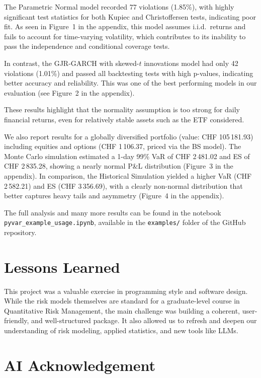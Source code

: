 \documentclass{article}
\begin{document}
The Parametric Normal model recorded 77 violations (1.85\%), with highly significant test statistics for both Kupiec and Christoffersen tests, indicating poor fit. As seen in Figure 1 in the appendix, this model assumes i.i.d.\ returns and fails to account for time-varying volatility, which contributes to its inability to pass the independence and conditional coverage tests.

In contrast, the GJR-GARCH with skewed-$t$ innovations model had only 42 violations (1.01\%) and passed all backtesting tests with high p-values, indicating better accuracy and reliability. This was one of the best performing models in our evaluation (see Figure 2 in the appendix).

These results highlight that the normality assumption is too strong for daily financial returns, even for relatively stable assets such as the ETF considered.

We also report results for a globally diversified portfolio (value: CHF 105\,181.93) including equities and options (CHF 1\,106.37, priced via the BS model). The Monte Carlo simulation estimated a 1-day 99\% VaR of CHF 2\,481.02 and ES of CHF 2\,835.28, showing a nearly normal P\&L distribution (Figure~3 in the appendix). In comparison, the Historical Simulation yielded a higher VaR (CHF 2\,582.21) and ES (CHF 3\,356.69), with a clearly non-normal distribution that better captures heavy tails and asymmetry (Figure~4 in the appendix).

The full analysis and many more results can be found in the notebook \texttt{pyvar\_example\_usage.ipynb}, available in the \texttt{examples/} folder of the GitHub repository.


\section{Lessons Learned}

This project was a valuable exercise in programming style and software design. While the risk models themselves are standard for a graduate-level course in Quantitative Risk Management, the main challenge was building a coherent, user-friendly, and well-structured package. It also allowed us to refresh and deepen our understanding of risk modeling, applied statistics, and new tools like LLMs.


\section{AI Acknowledgement}
\end{document}
